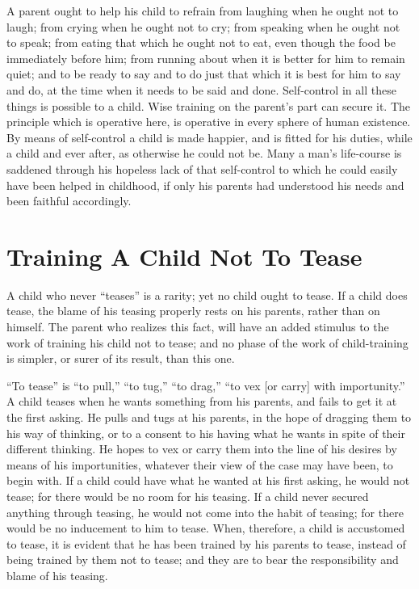 \documentclass[
]{book}
\begin{document}
A parent ought to help his child to refrain from laughing when he ought not to laugh; from crying when he ought not to cry; from speaking when he ought not to speak; from eating that which he ought not to eat, even though the food be immediately before him; from running about when it is better for him to remain quiet; and to be ready to say and to do just that which it is best for him to say and do, at the time when it needs to be said and done. Self-control in all these things is possible to a child. Wise training on the parent's part can secure it. The principle which is operative here, is operative in every sphere of human existence. By means of self-control a child is made happier, and is fitted for his duties, while a child and ever after, as otherwise he could not be. Many a man's life-course is saddened through his hopeless lack of that self-control to which he could easily have been helped in childhood, if only his parents had understood his needs and been faithful accordingly.

\hypertarget{training-a-child-not-to-tease}{%
\chapter{Training A Child Not To Tease}\label{training-a-child-not-to-tease}}

A child who never ``teases'' is a rarity; yet no child ought to tease. If a child does tease, the blame of his teasing properly rests on his parents, rather than on himself. The parent who realizes this fact, will have an added stimulus to the work of training his child not to tease; and no phase of the work of child-training is simpler, or surer of its result, than this one.

``To tease'' is ``to pull,'' ``to tug,'' ``to drag,'' ``to vex {[}or carry{]} with importunity.'' A child teases when he wants something from his parents, and fails to get it at the first asking. He pulls and tugs at his parents, in the hope of dragging them to his way of thinking, or to a consent to his having what he wants in spite of their different thinking. He hopes to vex or carry them into the line of his desires by means of his importunities, whatever their view of the case may have been, to begin with. If a child could have what he wanted at his first asking, he would not tease; for there would be no room for his teasing. If a child never secured anything through teasing, he would not come into the habit of teasing; for there would be no inducement to him to tease. When, therefore, a child is accustomed to tease, it is evident that he has been trained by his parents to tease, instead of being trained by them not to tease; and they are to bear the responsibility and blame of his teasing.
\end{document}
